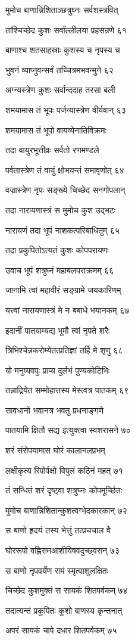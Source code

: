 मुमोच बाणान्निशिताञ्छत्रुघ्नः सर्वशस्त्रवित्

तांश्चिच्छेद कुशः सर्वांल्लीलया प्रहसन्रणे ६१

बाणाश्च शतसाहस्राः कुशस्य च नृपस्य च

भुवनं व्याप्नुवन्सर्वं तच्चित्रमभवन्मुने ६२

अग्न्यस्त्रेण कुशः सर्वान्ददाह तरसा बली

शमयामास तं भूपः पर्जन्यास्त्रेण वीर्यवान् ६३

शमयामास तं भूपो वायव्येनातिविक्रमः

तदा वायुरभूत्तीव्रः सर्वतो रणमण्डले

पर्वतास्त्रेण तं वायुं क्षोभयन्तं समावृणोत् ६४

वज्रास्त्रेण नृपः सङ्ख्ये चिच्छेद सनगोपलान्

तदा नारायणास्त्रं स मुमोच कुश उद्भटः

नारायणं तदा भूपं नाशकत्परिबाधितुम् ६५

तदा प्रकुपितोऽत्यतं कुशः कोपपरायणः

उवाच भूपं शत्रुघ्नं महाबलपराक्रमम् ६६

जानामि त्वां महावीरं सङ्ग्रामे जयकारिणम्

यत्त्वां नारायणास्त्रं मे न बबाधे भयानकम् ६७

इदानीं पातयाम्यद्य भूमौ त्वां नृपते शरैः

त्रिभिश्चेन्नकरोम्येतत्प्रतिज्ञां तर्हि मे शृणु ६८

यो मनुष्यवपुः प्राप्य दुर्लभं पुण्यकोटिभिः

तन्नाद्रियेत सम्मोहात्तस्य मेस्त्वत्र पातकम् ६९

सावधानो भवानत्र भवतु प्रधनाङ्गणे

पातयामि क्षितौ सद्य इत्युक्त्वा स्वशरासने ७०

शरं संरोपयामास घोरं कालानलप्रभम्

लक्षीकृत्य रिपोर्वक्षो विपुलं कठिनं महत् ७१

तं सन्धितं शरं दृष्ट्वा शत्रुघ्नः कोपमूर्च्छितः

मुमोच बाणान्निशितान्कुशत्वग्भेदकारकान् ७२

स बाणो हृदयं तस्य भेत्तुं तत्प्रचचाल वै

घोररूपो वह्निसमआशीविषवदुच्छ्वसन् ७३

स बाणो नृपवर्येण रामं स्मृत्वाशुलक्षितः

चिच्छेद कुशमुक्तं स सायकं शितपर्वकम् ७४

तदात्यन्तं प्रकुपितः कुशो बाणस्य कृन्तनात्

अपरं सायकं चापे दधार शितपर्वकम् ७५

